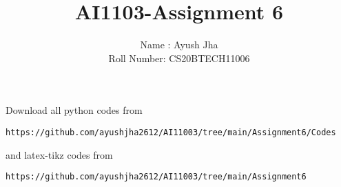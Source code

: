 \documentclass[journal,12pt,twocolumn]{IEEEtran}
\DeclareMathOperator*{\Res}{Res}
\begin{document}
\newcommand{\BEQA}{\begin{eqnarray}}
\newcommand{\EEQA}{\end{eqnarray}}
\newcommand{\define}{\stackrel{\triangle}{=}}

\raggedbottom
\setlength{\parindent}{0pt}
\providecommand{\mbf}{\mathbf}
\providecommand{\pr}[1]{\ensuremath{\Pr\left(#1\right)}}
\providecommand{\qfunc}[1]{\ensuremath{Q\left(#1\right)}}
\providecommand{\sbrak}[1]{\ensuremath{{}\left[#1\right]}}
\providecommand{\lsbrak}[1]{\ensuremath{{}\left[#1\right.}}
\providecommand{\rsbrak}[1]{\ensuremath{{}\left.#1\right]}}
\providecommand{\brak}[1]{\ensuremath{\left(#1\right)}}
\providecommand{\lbrak}[1]{\ensuremath{\left(#1\right.}}
\providecommand{\rbrak}[1]{\ensuremath{\left.#1\right)}}
\providecommand{\cbrak}[1]{\ensuremath{\left\{#1\right\}}}
\providecommand{\lcbrak}[1]{\ensuremath{\left\{#1\right.}}
\providecommand{\rcbrak}[1]{\ensuremath{\left.#1\right\}}}
\theoremstyle{remark}
\newtheorem{rem}{Remark}
\newcommand{\sgn}{\mathop{\mathrm{sgn}}}
\providecommand{\abs}[1]{\vert#1\vert}
\providecommand{\res}[1]{\Res\displaylimits_{#1}} 
\providecommand{\norm}[1]{\lVert#1\rVert}
\providecommand{\mtx}[1]{\mathbf{#1}}
\providecommand{\mean}[1]{E[ #1 ]}
\providecommand{\fourier}{\overset{\mathcal{F}}{ \rightleftharpoons}}
\providecommand{\system}{\overset{\mathcal{H}}{ \longleftrightarrow}}
\newcommand{\solution}{\noindent \textbf{Solution: }}
\newcommand{\cosec}{\,\text{cosec}\,}
\providecommand{\dec}[2]{\ensuremath{\overset{#1}{\underset{#2}{\gtrless}}}}
\newcommand{\myvec}[1]{\ensuremath{\begin{pmatrix}#1\end{pmatrix}}}
\newcommand{\mydet}[1]{\ensuremath{\begin{vmatrix}#1\end{vmatrix}}}
\makeatletter
{}
\makeatother
\let\StandardTheFigure\thefigure
\let\vec\mathbf
\renewcommand{\thefigure}{\theproblem}
\def\putbox#1#2#3{\makebox[0in][l]{\makebox[#1][l]{}\raisebox{\baselineskip}[0in][0in]{\raisebox{#2}[0in][0in]{#3}}}}
     \def\rightbox#1{\makebox[0in][r]{#1}}
     \def\centbox#1{\makebox[0in]{#1}}
     \def\topbox#1{\raisebox{-\baselineskip}[0in][0in]{#1}}
     \def\midbox#1{\raisebox{-0.5\baselineskip}[0in][0in]{#1}}
\vspace{3cm}
\title{AI1103-Assignment 6}
\author{Name : Ayush Jha \\ Roll Number: CS20BTECH11006}
\maketitle
\newpage
\bigskip
\renewcommand{\thefigure}{\theenumi}
\renewcommand{\thetable}{\theenumi}
Download all python codes from 
\begin{lstlisting}
https://github.com/ayushjha2612/AI11003/tree/main/Assignment6/Codes
\end{lstlisting}
%
and latex-tikz codes from 
%
\begin{lstlisting}
https://github.com/ayushjha2612/AI11003/tree/main/Assignment6
\end{lstlisting}
\end{document}
